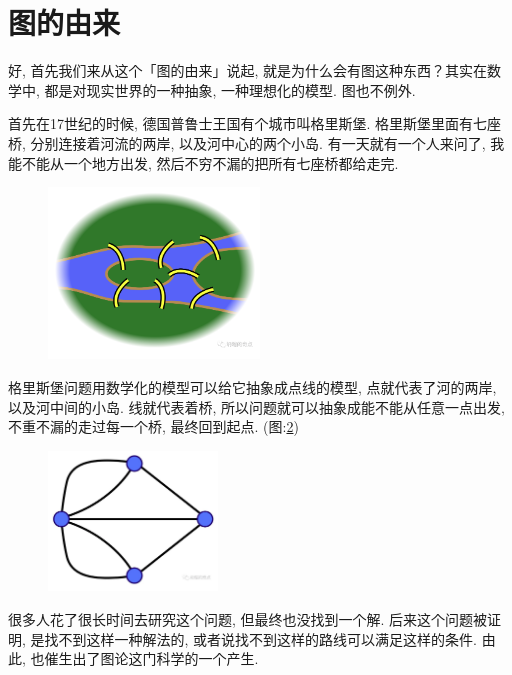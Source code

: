 \section{图的由来}

好, 首先我们来从这个「图的由来」说起, 就是为什么会有图这种东西？其实在数学中, 都是对现实世界的一种抽象, 一种理想化的模型. 图也不例外. 

首先在17世纪的时候, 德国普鲁士王国有个城市叫格里斯堡. 格里斯堡里面有七座桥, 分别连接着河流的两岸, 以及河中心的两个小岛. 有一天就有一个人来问了, 我能不能从一个地方出发, 然后不穷不漏的把所有七座桥都给走完. 

\begin{figure}[ht]
  \centering
  \includegraphics[width=0.5\textwidth]{asset/20231227144751.png}
  \caption{}
  \label{fig:img24_1}
\end{figure}

格里斯堡问题用数学化的模型可以给它抽象成点线的模型, 点就代表了河的两岸, 以及河中间的小岛. 线就代表着桥, 所以问题就可以抽象成能不能从任意一点出发, 不重不漏的走过每一个桥, 最终回到起点. (图:\ref{fig:img24_2})

\begin{figure}[ht]
  \centering
  \includegraphics[width=0.4\textwidth]{asset/20231227144732.png}
  \caption{}
  \label{fig:img24_2}
\end{figure}

很多人花了很长时间去研究这个问题, 但最终也没找到一个解. 后来这个问题被证明, 是找不到这样一种解法的, 或者说找不到这样的路线可以满足这样的条件. 由此, 也催生出了图论这门科学的一个产生. 

